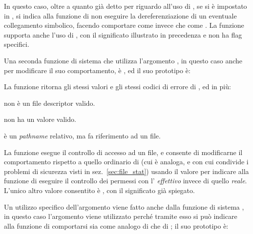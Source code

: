 In questo caso, oltre a quanto già detto per  riguardo all'uso di
, se si è impostato  in
, si indica alla funzione di non eseguire la dereferenziazione di
un eventuale collegamento simbolico, facendo comportare  come
 invece che come . La funzione supporta anche l'uso
di , con il significato illustrato in precedenza e non
ha flag specifici.

Una seconda funzione di sistema che utilizza l'argomento , in
questo caso anche per modificare il suo comportamento, è , ed
il suo prototipo è:

\begin{funcproto}{
}

{La funzione ritorna gli stessi valori e gli stessi codici di errore di
  , ed in più:
  \begin{errlist}
  \item[\errcode{EBADF}]  non è un file descriptor valido.
  \item[\errcode{EINVAL}]  non ha un valore valido.
  \item[\errcode{ENOTDIR}]  è un \textit{pathname} relativo,
    ma  fa riferimento ad un file.
  \end{errlist}
}  
\end{funcproto}

La funzione esegue il controllo di accesso ad un file, e 
consente di modificarne il comportamento rispetto a quello ordinario di
 (cui è analoga, e con cui condivide i problemi di sicurezza
visti in sez.~\ref{sec:file_stat}) usando il valore  per
indicare alla funzione di eseguire il controllo dei permessi con l'
\textsl{effettivo} invece di quello \textsl{reale}. L'unico altro valore
consentito è , con il significato già spiegato.

Un utilizzo specifico dell'argomento  viene fatto anche dalla
funzione di sistema , in questo caso l'argomento viene
utilizzato perché tramite esso si può indicare alla funzione di comportarsi
sia come analogo di  che di ; il suo prototipo è:

